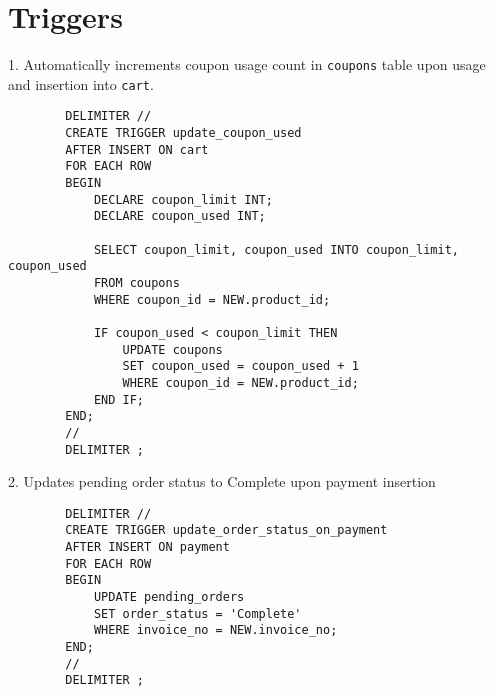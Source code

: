 \documentclass{article}
\begin{document}
\vspace{5mm}


\section*{Triggers}

\vspace{3mm}

1. Automatically increments coupon usage count in \texttt{coupons} table upon usage and insertion into \texttt{cart}.

\begin{verbatim}
        DELIMITER //
        CREATE TRIGGER update_coupon_used
        AFTER INSERT ON cart
        FOR EACH ROW
        BEGIN
            DECLARE coupon_limit INT;
            DECLARE coupon_used INT;
        
            SELECT coupon_limit, coupon_used INTO coupon_limit, coupon_used
            FROM coupons
            WHERE coupon_id = NEW.product_id;
        
            IF coupon_used < coupon_limit THEN
                UPDATE coupons
                SET coupon_used = coupon_used + 1
                WHERE coupon_id = NEW.product_id;
            END IF;
        END;
        //
        DELIMITER ;
\end{verbatim}

2. Updates pending order status to Complete upon payment insertion

\begin{verbatim}
        DELIMITER //
        CREATE TRIGGER update_order_status_on_payment
        AFTER INSERT ON payment
        FOR EACH ROW
        BEGIN
            UPDATE pending_orders
            SET order_status = 'Complete'
            WHERE invoice_no = NEW.invoice_no;
        END;
        //
        DELIMITER ;

\end{verbatim}
\end{document}
